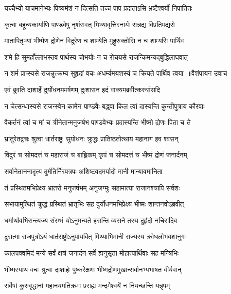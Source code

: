 \twolineshloka
{यच्चैभ्यो याचमानेभ्यः पित्र्यमंशं न दित्सति}
{तच्च पाप प्रदाताऽसि भ्रष्टैश्वर्यो निपातितः}


\twolineshloka
{कृत्वा बहून्यकार्याणि पाण्डवेषु नृशंसवत्}
{मिथ्यावृत्तिरनार्यः सन्नद्य विप्रतिपद्यसे}


\twolineshloka
{मातापितृभ्यां भीष्मेण द्रोणेन विदुरेण च}
{शाम्येति मुहुरुक्तोसि न च शाम्यसि पार्थिव}


\twolineshloka
{शमे हि सुमहाँल्लाभस्तव पार्थस्य चोभयोः}
{न च रोचयसे राजन्किमन्यद्बुद्धिलाघवात्}


\threelineshloka
{न शर्म प्राप्स्यसे राजन्नुत्क्रम्य सुहृदां वचः}
{अधर्म्यमयशस्यं च क्रियते पार्थिव त्वया ॥वैशंपायन उवाच}
{}


\twolineshloka
{एवं ब्रुवति दाशार्हे दुर्योधनममर्षणम्}
{दुःशासन इदं वाक्यमब्रवीत्करुसंसदि}


\twolineshloka
{न चेत्सन्धास्यसे राजन्स्वेन कामेन पाण्डवैः}
{बद्ध्वा किल त्वां दास्यन्ति कुन्तीपुत्राय कौरवाः}


\twolineshloka
{वैकर्तनं त्वां च मां च त्रीनेतान्मनुजर्षभ}
{पाण्डवेभ्यः प्रदास्यन्ति भीष्मो द्रोणः पिता च ते}


\twolineshloka
{भ्रातुरेतद्वचः श्रुत्वा धार्तराष्ट्रः सुयोधनः}
{क्रुद्धः प्रातिष्ठतोत्थाय महानाग इव श्वसन्}


\twolineshloka
{विदुरं च सोमदत्तं च महाराजं च बाह्लिकम्}
{कृपं च सोमदत्तं च भीष्मं द्रोणं जनार्दनम्}


\twolineshloka
{सर्वानेताननादृत्य दुर्मतिर्निरपत्रपः}
{अशिष्टवदमर्यादो मानी मान्यावमानिता}


\twolineshloka
{तं प्रस्थितमभिप्रेक्ष्य भ्रातरो मनुजर्षभम्}
{अनुजग्मुः सहामात्या राजानश्चापि सर्वशः}


\twolineshloka
{सभायामुत्थितं क्रुद्धं प्रस्थितं भ्रातृभिः सह}
{दुर्योधनमभिप्रेक्ष्य भीष्मः शान्तनवोऽब्रवीत्}


\twolineshloka
{धर्मार्थावभिसन्त्यज्य संरम्भं योऽनुमन्यते}
{हसन्ति व्यसने तस्य दुर्हृदो नचिरादिव}


\twolineshloka
{दुरात्मा राजपुत्रोऽयं धार्तराष्ट्रोऽनुपायवित्}
{मिथ्याभिमानी राज्यस्य क्रोधलोभवशानुगः}


\twolineshloka
{कालपक्वमिदं मन्ये सर्वं क्षत्रं जनार्दन}
{सर्वे ह्यनुसृता मोहात्पार्थिवाः सह मन्त्रिभिः}


\twolineshloka
{भीष्मस्याथ वचः श्रुत्वा दाशार्हः पुष्करेक्षणः}
{भीष्मद्रोणमुखान्सर्वानभ्यभाषत वीर्यवान्}


\twolineshloka
{सर्वेषां कुरुवृद्धानां महानयमतिक्रमः}
{प्रसह्य मन्दमैश्वर्ये न नियच्छन्ति यन्नृपम्}


